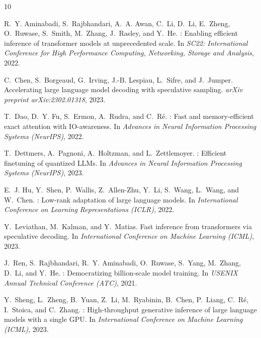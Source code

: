 \documentclass{article}
\begin{document}

\begin{thebibliography}{10}
\providecommand{\natexlab}[1]{#1}

R.~Y. Aminabadi, S.~Rajbhandari, A.~A. Awan, C.~Li, D.~Li, E.~Zheng, O.~Ruwase,
  S.~Smith, M.~Zhang, J.~Rasley, and Y.~He.
: Enabling efficient inference of transformer
  models at unprecedented scale.
\newblock In \emph{SC22: International Conference for High Performance Computing,
  Networking, Storage and Analysis}, 2022.

C.~Chen, S.~Borgeaud, G.~Irving, J.-B. Lespiau, L.~Sifre, and J.~Jumper.
\newblock Accelerating large language model decoding with speculative sampling.
\newblock \emph{arXiv preprint arXiv:2302.01318}, 2023.

T.~Dao, D.~Y. Fu, S.~Ermon, A.~Rudra, and C.~R{\'e}.
: Fast and memory-efficient exact attention with
  {IO}-awareness.
\newblock In \emph{Advances in Neural Information Processing Systems (NeurIPS)}, 2022.

T.~Dettmers, A.~Pagnoni, A.~Holtzman, and L.~Zettlemoyer.
: Efficient finetuning of quantized {LLM}s.
\newblock In \emph{Advances in Neural Information Processing Systems (NeurIPS)}, 2023.

E.~J. Hu, Y.~Shen, P.~Wallis, Z.~Allen-Zhu, Y.~Li, S.~Wang, L.~Wang, and W.~Chen.
: Low-rank adaptation of large language models.
\newblock In \emph{International Conference on Learning Representations (ICLR)}, 2022.

Y.~Leviathan, M.~Kalman, and Y.~Matias.
\newblock Fast inference from transformers via speculative decoding.
\newblock In \emph{International Conference on Machine Learning (ICML)}, 2023.

J.~Ren, S.~Rajbhandari, R.~Y. Aminabadi, O.~Ruwase, S.~Yang, M.~Zhang, D.~Li,
  and Y.~He.
: Democratizing billion-scale model training.
\newblock In \emph{USENIX Annual Technical Conference (ATC)}, 2021.

Y.~Sheng, L.~Zheng, B.~Yuan, Z.~Li, M.~Ryabinin, B.~Chen, P.~Liang, C.~R{\'e},
  I.~Stoica, and C.~Zhang.
: High-throughput generative inference of large language
  models with a single {GPU}.
\newblock In \emph{International Conference on Machine Learning (ICML)}, 2023.

\end{thebibliography}
\end{document}
